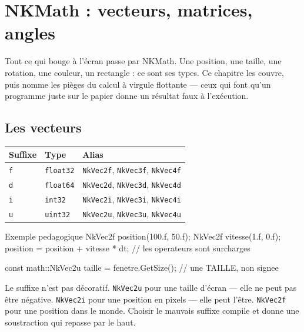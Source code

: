 \chapter{NKMath : vecteurs, matrices, angles}

Tout ce qui bouge à l'écran passe par NKMath. Une position, une taille, une
rotation, une couleur, un rectangle : ce sont ses types. Ce chapitre les couvre,
puis nomme les pièges du calcul à virgule flottante --- ceux qui font qu'un
programme juste sur le papier donne un résultat faux à l'exécution.

\section{Les vecteurs}

\begin{center}
\begin{tabular}{@{}lll@{}}
\toprule
\textbf{Suffixe} & \textbf{Type} & \textbf{Alias} \\
\midrule
\texttt{f} & \texttt{float32} & \texttt{NkVec2f}, \texttt{NkVec3f}, \texttt{NkVec4f} \\
\texttt{d} & \texttt{float64} & \texttt{NkVec2d}, \texttt{NkVec3d}, \texttt{NkVec4d} \\
\texttt{i} & \texttt{int32}   & \texttt{NkVec2i}, \texttt{NkVec3i}, \texttt{NkVec4i} \\
\texttt{u} & \texttt{uint32}  & \texttt{NkVec2u}, \texttt{NkVec3u}, \texttt{NkVec4u} \\
\bottomrule
\end{tabular}
\end{center}

\begin{nkcode}{Exemple pedagogique}
NkVec2f position(100.f, 50.f);
NkVec2f vitesse(1.f, 0.f);
position = position + vitesse * dt;      // les operateurs sont surcharges

const math::NkVec2u taille = fenetre.GetSize();   // une TAILLE, non signee
\end{nkcode}

\begin{nkretenir}
Le suffixe n'est pas décoratif. \texttt{NkVec2u} pour une taille d'écran ---
elle ne peut pas être négative. \texttt{NkVec2i} pour une position en pixels ---
elle peut l'être. \texttt{NkVec2f} pour une position dans le monde. Choisir le
mauvais suffixe compile et donne une soustraction qui repasse par le haut.
\end{nkretenir}

